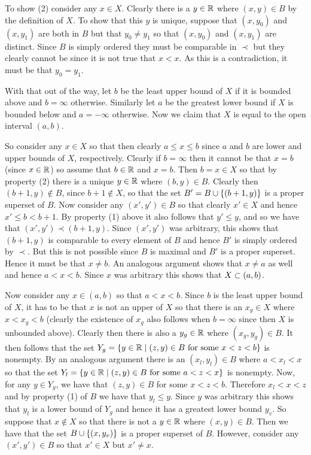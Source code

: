 {{    To show (2) consider any $x \in X$.
    Clearly there is a $y \in \reals$ where $(x,y) \in B$ by the definition of $X$.
    To show that this $y$ is unique, suppose that $(x,y_0)$ and $(x,y_1)$ are both in $B$ but that $y_0 \neq y_1$ so that $(x,y_0)$ and $(x,y_1)$ are distinct.
    Since $B$ is simply ordered they must be comparable in $\prec$ but they clearly cannot be since it is not true that $x < x$.
    As this is a contradiction, it must be that $y_0 = y_1$.

    With that out of the way, let $b$ be the least upper bound of $X$ if it is bounded above and $b = \infty$ otherwise.
    Similarly let $a$ be the greatest lower bound if $X$ is bounded below and $a = -\infty$ otherwise.
    Now we claim that $X$ is equal to the open interval $(a,b)$.

    So consider any $x \in X$ so that then clearly $a \leq x \leq b$ since $a$ and $b$ are lower and upper bounds of $X$, respectively.
    Clearly if $b = \infty$ then it cannot be that $x = b$ (since $x \in \reals$) so assume that $b \in \reals$ and $x = b$.
    Then $b = x \in X$ so that by property (2) there is a unique $y \in \reals$ where $(b,y) \in B$.
    Clearly then $(b+1,y) \notin B$, since $b+1 \notin X$,  so that the set $B' = B \cup \braces{(b+1,y)}$ is a proper superset of $B$.
    Now consider any $(x',y') \in B$ so that clearly $x' \in X$ and hence $x' \leq b < b+1$.
    By property (1) above it also follows that $y' \leq y$, and so we have that $(x',y') \prec (b+1, y)$.
    Since $(x',y')$ was arbitrary, this shows that $(b+1,y)$ is comparable to every element of $B$ and hence $B'$ is simply ordered by $\prec$.
    But this is not possible since $B$ is maximal and $B'$ is a proper superset.
    Hence it must be that $x \neq b$.
    An analogous argument shows that $x \neq a$ as well and hence $a < x < b$.
    Since $x$ was arbitrary this shows that $X \ss (a,b)$.

    Now consider any $x \in (a,b)$ so that $a < x < b$.
    Since $b$ is the least upper bound of $X$, it has to be that $x$ is not an upper of $X$ so that there is an $x_g \in X$ where $x < x_g < b$ (clearly the existence of $x_g$ also follows when $b = \infty$ since then $X$ is unbounded above).
    Clearly then there is also a $y_g \in \reals$ where $(x_g,y_g) \in B$.
    It then follows that the set $Y_g = \braces{y \in \reals \where (z,y) \in B \text{ for some } x < z < b}$ is nonempty.
    By an analogous argument there is an $(x_l,y_l) \in B$ where $a < x_l < x$ so that the set $Y_l = \braces{y \in \reals \where (z,y) \in B \text{ for some } a < z < x}$ is nonempty.
    Now, for any $y \in Y_g$, we have that $(z, y) \in B$ for some $x < z < b$.
    Therefore $x_l < x < z$ and by property (1) of $B$ we have that $y_l \leq y$.
    Since $y$ was arbitrary this shows that $y_l$ is a lower bound of $Y_g$ and hence it has a greatest lower bound $y_v$.
    So suppose that $x \notin X$ so that there is not a $y \in \reals$ where $(x,y) \in B$.
    Then we have that the set $B \cup \braces{(x,y_v)}$ is a proper superset of $B$.
    However, consider any $(x',y') \in B$ so that $x' \in X$ but $x' \neq x$.

}}
